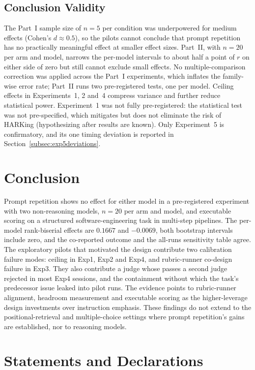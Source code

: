 \documentclass[11pt,a4paper]{article}
\begin{document}
\subsection{Conclusion Validity}

The Part~I sample size of $n{=}5$ per condition was underpowered for medium effects (Cohen's $d \approx 0.5$), so the pilots cannot conclude that prompt repetition has no practically meaningful effect at smaller effect sizes.
Part~II, with $n{=}20$ per arm and model, narrows the per-model intervals to about half a point of $r$ on either side of zero but still cannot exclude small effects.
No multiple-comparison correction was applied across the Part~I experiments, which inflates the family-wise error rate; Part~II runs two pre-registered tests, one per model.
Ceiling effects in Experiments~1, 2 and~4 compress variance and further reduce statistical power.
Experiment~1 was not fully pre-registered: the statistical test was not pre-specified, which mitigates but does not eliminate the risk of HARKing (hypothesizing after results are known).
Only Experiment~5 is confirmatory, and its one timing deviation is reported in Section~\ref{subsec:exp5deviations}.

\section{Conclusion}
\label{sec:conclusion}

Prompt repetition shows no effect for either model in a pre-registered experiment with two non-reasoning models, $n{=}20$ per arm and model, and executable scoring on a structured software-engineering task in multi-step pipelines.
The per-model rank-biserial effects are $0.1667$ and $-0.0069$, both bootstrap intervals include zero, and the co-reported outcome and the all-runs sensitivity table agree.
The exploratory pilots that motivated the design contribute two calibration failure modes: ceiling in Exp1, Exp2 and Exp4, and rubric-runner co-design failure in Exp3.
They also contribute a judge whose passes a second judge rejected in most Exp4 sessions, and the containment without which the task's predecessor issue leaked into pilot runs.
The evidence points to rubric-runner alignment, headroom measurement and executable scoring as the higher-leverage design investments over instruction emphasis.
These findings do not extend to the positional-retrieval and multiple-choice settings where prompt repetition's gains are established, nor to reasoning models.

\section*{Statements and Declarations}
\end{document}
